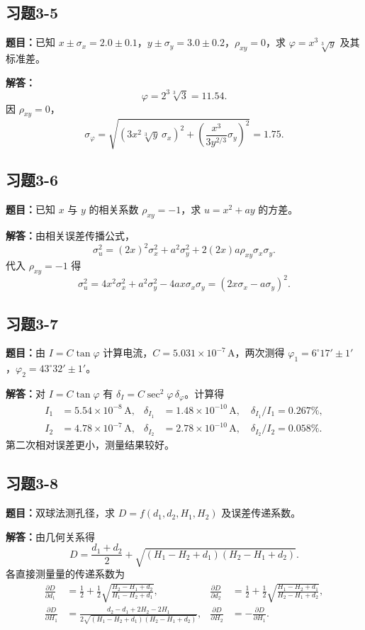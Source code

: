 \documentclass[UTF8,zihao=-4]{ctexart}
\newcommand{\problem}[1]{\subsection*{#1}}
\newcommand{\timu}{\noindent\textbf{题目：}}
\newcommand{\jieda}{\noindent\textbf{解答：}}
\begin{document}
{\problem{习题3-5}
\timu 已知 $x\pm\sigma_x=2.0\pm0.1$，$y\pm\sigma_y=3.0\pm0.2$，$\rho_{xy}=0$，求 $\varphi=x^3\sqrt[3]{y}$ 及其标准差。

\jieda
\begin{equation*}
    \varphi=2^3\sqrt[3]{3}=11.54.
\end{equation*}
因 $\rho_{xy}=0$，
\begin{equation*}
    \sigma_\varphi=\sqrt{\left(3x^2\sqrt[3]{y}\,\sigma_x\right)^2+
    \left(\frac{x^3}{3y^{2/3}}\sigma_y\right)^2}=1.75.
\end{equation*}

\problem{习题3-6}
\timu 已知 $x$ 与 $y$ 的相关系数 $\rho_{xy}=-1$，求 $u=x^2+ay$ 的方差。

\jieda 由相关误差传播公式，
\begin{equation*}
    \sigma_u^2=(2x)^2\sigma_x^2+a^2\sigma_y^2+2(2x)a\rho_{xy}\sigma_x\sigma_y.
\end{equation*}
代入 $\rho_{xy}=-1$ 得
\begin{equation*}
    \sigma_u^2=4x^2\sigma_x^2+a^2\sigma_y^2-4ax\sigma_x\sigma_y=(2x\sigma_x-a\sigma_y)^2.
\end{equation*}

\problem{习题3-7}
\timu 由 $I=C\tan\varphi$ 计算电流，$C=5.031\times10^{-7}\,\mathrm{A}$，两次测得 $\varphi_1=6^\circ17'\pm1'$，$\varphi_2=43^\circ32'\pm1'$。

\jieda 对 $I=C\tan\varphi$ 有 $\delta_I=C\sec^2\varphi\,\delta_\varphi$。计算得
\begin{equation*}
\begin{aligned}
    I_1&=5.54\times10^{-8}\,\mathrm{A},& \delta_{I_1}&=1.48\times10^{-10}\,\mathrm{A},\quad \delta_{I_1}/I_1=0.267\%,\\
    I_2&=4.78\times10^{-7}\,\mathrm{A},& \delta_{I_2}&=2.78\times10^{-10}\,\mathrm{A},\quad \delta_{I_2}/I_2=0.058\%.
\end{aligned}
\end{equation*}
第二次相对误差更小，测量结果较好。

\problem{习题3-8}
\timu 双球法测孔径，求 $D=f(d_1,d_2,H_1,H_2)$ 及误差传递系数。

\jieda 由几何关系得
\begin{equation*}
    D=\frac{d_1+d_2}{2}+\sqrt{(H_1-H_2+d_1)(H_2-H_1+d_2)}.
\end{equation*}
各直接测量量的传递系数为
\begin{equation*}
\begin{aligned}
    \frac{\partial D}{\partial d_1}&=\frac12+\frac12\sqrt{\frac{H_2-H_1+d_2}{H_1-H_2+d_1}},&
    \frac{\partial D}{\partial d_2}&=\frac12+\frac12\sqrt{\frac{H_1-H_2+d_1}{H_2-H_1+d_2}},\\
    \frac{\partial D}{\partial H_1}&=\frac{d_2-d_1+2H_2-2H_1}{2\sqrt{(H_1-H_2+d_1)(H_2-H_1+d_2)}},&
    \frac{\partial D}{\partial H_2}&=-\frac{\partial D}{\partial H_1}.
\end{aligned}
\end{equation*}

}
\end{document}
